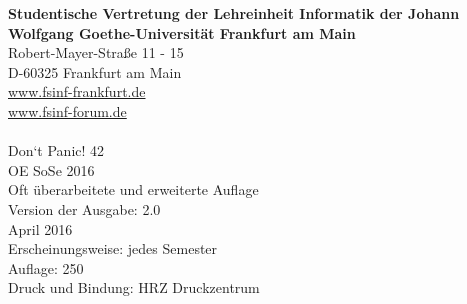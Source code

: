 \spaltenanfang
\noindent\textbf{Studentische Vertretung der Lehreinheit Informatik der Johann Wolfgang Goethe-Universität Frankfurt am Main}\\
Robert-Mayer-Straße 11 - 15\\
D-60325 Frankfurt am Main\\
\url{www.fsinf-frankfurt.de}\\
\url{www.fsinf-forum.de}\\
\emailfachschaft\\
Don‘t Panic! 42\\
OE SoSe 2016\\
Oft überarbeitete und erweiterte Auflage\\
Version der Ausgabe: 2.0\\
April 2016\\
Erscheinungsweise: jedes Semester\\
Auflage: 250\\
Druck und Bindung: HRZ Druckzentrum

\spaltenende
